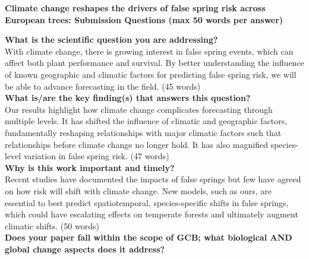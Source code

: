 \documentclass{article}\usepackage[]{graphicx}\usepackage[]{color}
\begin{document}
\nobibliography*
\noindent \textbf{\Large{Climate change reshapes the drivers of false spring risk across European trees: Submission Questions (max 50 words per answer)}}\\
\vspace{3ex}

\noindent \textbf{What is the scientific question you are addressing?} \\

\noindent With climate change, there is growing interest in false spring events, which can affect both plant performance and survival. By better understanding the influence of known geographic and climatic factors for predicting false spring risk, we will be able to advance forecasting in the field.  (45 words) \\

\noindent \textbf{What is/are the key finding(s) that answers this question?} \\

\noindent Our results highlight how climate change complicates forecasting through multiple levels. It has shifted the influence of climatic and geographic factors, fundamentally reshaping relationships with major climatic factors such that relationships before climate change no longer hold. It has also magnified species-level variation in false spring risk. (47 words) \\ 


\noindent \textbf{Why is this work important and timely?}\\

\noindent Recent studies have documented the impacts of false springs but few have agreed on how risk will shift with climate change. New models, such as ours, are essential to best predict spatiotemporal, species-specific shifts in false springs, which could have escalating effects on temperate forests and ultimately augment climatic shifts. (50 words) \\


\noindent \textbf{ Does your paper fall within the scope of GCB; what biological AND global change aspects does it address?}\\
\end{document}
